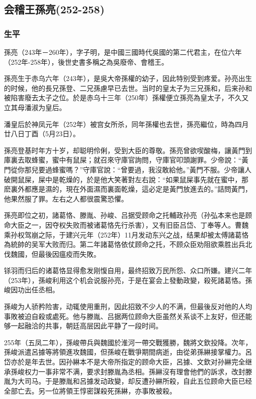 
\subsection{会稽王孫亮\tiny(252-258)}

\subsubsection{生平}

孫亮（243年－260年），字子明，是中國三國時代吳國的第二代君主，在位六年（252年-258年），後世史書多稱之為吳廢帝、會稽王。

孫亮生于赤乌六年（243年），是吳大帝孫權的幼子，因此特别受到疼爱。孙亮出生的时候，他的長兄孫登、二兄孫慮早已去世。当时的皇太子为三兄孫和，后来孙和被陷害廢去太子之位。於是赤乌十三年（250年）孫權便立孫亮為皇太子，不久又立其母潘淑为皇后。

潘皇后於神凤元年（252年）被宫女所杀，同年孫權也去世，孫亮繼位，時為四月廿八日丁酉（5月23日）。

孫亮登基时年方十岁，却聪明伶俐，受到大臣的尊敬。孫亮曾欲喫酸梅，讓黃門到庫裏去取蜂蜜，蜜中有鼠屎；就召來守庫官詢問，守庫官叩頭謝罪。少帝說：“黃門從你那兒要過蜂蜜嗎？”守庫官說：“曾要過，我沒敢給他。”黃門不服。少帝讓人破開鼠屎，屎中是乾燥的，於是他大笑著對左右說：“如果鼠屎事先就在蜜中，那麽裏外都應是濕的，現在外面濕而裏面乾燥，這必定是黃門放進去的。”詰問黃門，他果然服了罪。左右之人都很震驚恐懼。

孫亮即位之初，諸葛恪、滕胤、孙峻、吕据受顾命之托輔政孙亮（孙弘本来也是顾命大臣之一，因夺权失败而被诸葛恪先行杀害），又有旧臣吕岱、丁奉等人。曹魏乘孙权驾崩之际，于建兴元年（252年）11月发动东兴之战，结果却被太傅諸葛恪為統帥的吴军大败而归。第二年諸葛恪依仗顾命之托，不顾众臣劝阻欲乘胜出兵北伐魏國，但最後因瘟疫而失敗。

铩羽而归后的诸葛恪显得愈发刚愎自用，最终招致万民所怨、众口所嫌。建兴二年（253年），孫峻利用这个机会说服孙亮，于是在宴会上發動政變，殺死諸葛恪。孫峻因功出任丞相。

孫峻为人骄矜险害，动辄使用重刑，因此招致不少人的不满，但最後反对他的人均事敗被迫自殺或處死。他与滕胤、吕据两位顾命大臣虽然关系谈不上友好，但还能够一起融洽的共事，朝廷高层因此平静了一段时间。

255年（五凤二年），孫峻帶兵與魏國於淮河一帶交戰獲勝，魏將文欽投降。次年，孫峻派遣呂據等將領進攻魏國，但孫峻在戰爭期間病逝，由從弟孫綝接掌權力。呂岱亦於是年去世。因孙綝本不是大帝所指定的顾命大臣，呂據、文欽对孙綝完全继承孫峻权力一事非常不满，要求封滕胤為丞相。孫綝沒有理會他們的訴求，改封滕胤为大司马。于是滕胤和呂據发动政變，却反遭孙綝所殺，自此五位顾命大臣已经全部亡去。另一位將領王惇密謀殺死孫綝，亦事敗被殺。

